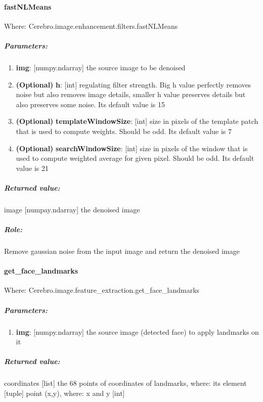 \paragraph{fastNLMeans}
Where: Cerebro.image.enhancement.filters.fastNLMeans
\subparagraph{Parameters:}
\begin{changemargin}{0.5cm}{0cm}
	\begin{enumerate} 
		\item \textbf{img}: [numpy.ndarray] the source image to be denoised
		\item \textbf{(Optional)} \textbf{h}: [int] regulating filter strength. Big h value perfectly removes noise but also removes image details, smaller h value preserves details but also preserves some noise. Its default value is 15
		\item \textbf{(Optional)} \textbf{templateWindowSize}: [int] size in pixels of the template patch that is used to compute weights. Should be odd. Its default value is 7
		\item \textbf{(Optional)} \textbf{searchWindowSize}: [int] size in pixels of the window that is used to compute weighted average for given pixel. Should be odd. Its default value is 21
	\end{enumerate}
\end{changemargin}

\subparagraph{Returned value:}
\begin{changemargin}{1cm}{0cm}
	image [numpay.ndarray] the denoised image
\end{changemargin}

\subparagraph{Role:}
\begin{changemargin}{1cm}{0cm}
	Remove gaussian noise from the input image and return the denoised image
\end{changemargin}

\paragraph{get\_face\_landmarks}
Where: Cerebro.image.feature\_extraction.get\_face\_landmarks
\subparagraph{Parameters:}
\begin{changemargin}{0.5cm}{0cm}
	\begin{enumerate} 
		\item \textbf{img}: [numpy.ndarray] the source image (detected face) to apply landmarks on it
	\end{enumerate}
\end{changemargin}

\subparagraph{Returned value:}
\begin{changemargin}{1cm}{0cm}
	coordinates [list] the 68 points of coordinates of landmarks, where: its element [tuple] point (x,y), where: x and y [int]
\end{changemargin}

